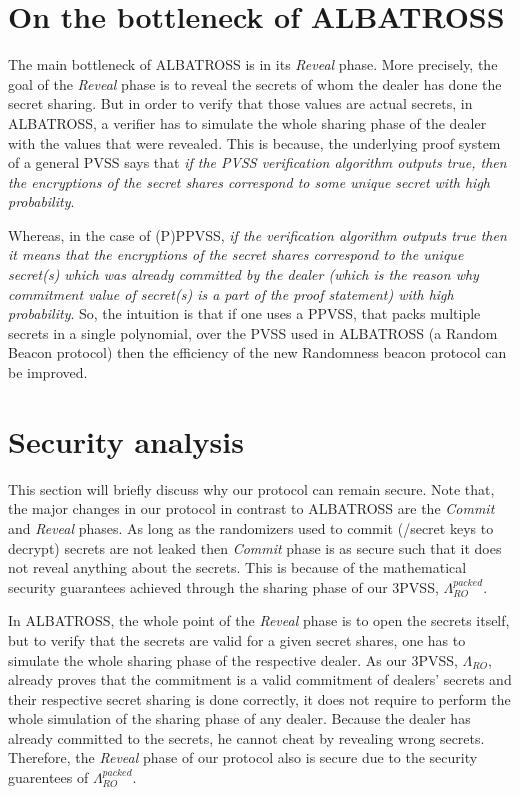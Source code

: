 \section{On the bottleneck of ALBATROSS}
The main bottleneck of ALBATROSS is in its \textit{Reveal} phase. More precisely, the 
goal of the \textit{Reveal} phase is to reveal the secrets of whom the dealer has done the 
secret sharing. But in order to verify that those values are actual secrets, in ALBATROSS, a 
verifier has to simulate the whole sharing phase of the dealer with the values that were 
revealed. This is because, the underlying proof system of a general PVSS says that \textit{if the 
PVSS verification algorithm outputs true, then the encryptions of the secret shares correspond 
to some unique secret with high probability}.\par

Whereas, in the case of (P)PPVSS, \textit{if the verification algorithm outputs true then it means 
that the encryptions of the secret shares correspond to the unique secret(s) which was 
already committed by the dealer (which is the reason why commitment value of secret(s) 
is a part of the proof statement) with high probability}. So, the intuition is that if one 
uses a PPVSS, that packs multiple secrets in a single polynomial, over the PVSS used in 
ALBATROSS (a Random Beacon protocol) then the efficiency of the new Randomness beacon 
protocol can be improved.

\section{Security analysis}
This section will briefly discuss why our protocol can remain secure. Note that, the major changes 
in our protocol in contrast to ALBATROSS are the \textit{Commit} and \textit{Reveal} 
phases. As long as the randomizers used to commit (/secret keys to decrypt) secrets are 
not leaked then \textit{Commit} phase is as secure such that it does not reveal anything 
about the secrets. This is because of the mathematical security guarantees achieved 
through the sharing phase of our 3PVSS, $\Lambda_{RO}^{packed}$.\par

In ALBATROSS, the whole point of the \textit{Reveal} phase is to open the secrets itself, 
but to verify that the secrets are valid for a given secret shares, one has to simulate 
the whole sharing phase of the respective dealer. As our 3PVSS, $\Lambda_{RO}$, already 
proves that the commitment is a valid commitment of dealers' secrets and their respective 
secret sharing is done correctly, it does not require to perform the whole simulation of 
the sharing phase of any dealer. Because the dealer has already committed to the 
secrets, he cannot cheat by revealing wrong secrets. Therefore, the \textit{Reveal} 
phase of our protocol also is secure due to the security guarentees of $\Lambda_{RO}^{packed}$.


